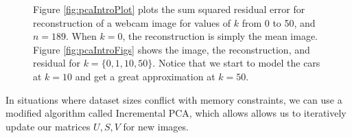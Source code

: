 \begin{figure}[t]
	\centering
	
		\caption[PCA reconstruction and residual images for different values of k]{Figure \ref{fig:pcaIntroPlot} plots the sum squared residual error for reconstruction of a webcam image for values of $k$ from 0 to 50, and $n = 189$.  When $k = 0$, the reconstruction is simply the mean image.  Figure \ref{fig:pcaIntroFigs} shows the image, the reconstruction, and residual for $k = \{0, 1, 10, 50\}$.  Notice that we start to model the cars at $k=10$ and get a great approximation at $k=50$.}
\label{fig:pcaIntro}
\end{figure}

In situations where dataset sizes conflict with memory constraints, we can use a modified algorithm called Incremental PCA, which allows allows us to iteratively update our matrices $U, S, V$ for new images\cite{Brand02incrementalsingular}.